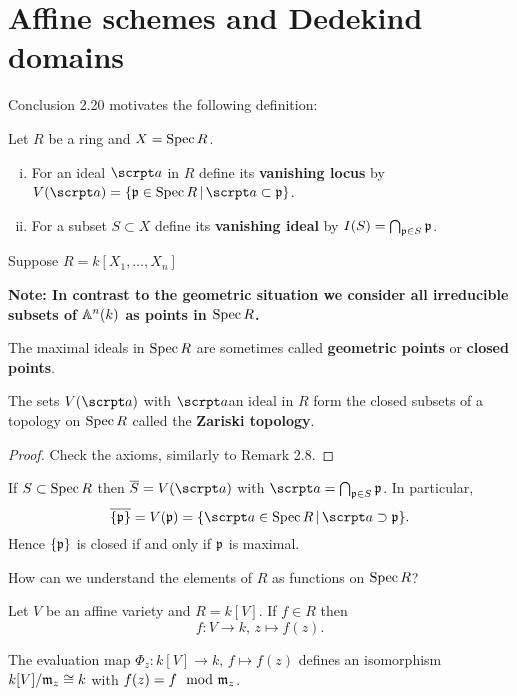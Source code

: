 \section{Affine schemes and Dedekind domains}
Conclusion 2.20 motivates the following definition:

\begin{defi}
Let $R$ be a ring and $X= \operatorname{Spec} R$.
\begin{enumerate}[(i)]
\item For an ideal $\a$ in $R$ define its \textbf{vanishing locus} by $V(\a) = \{\p \in \Spec R \, | \, \a \subset \p  \}$.
\item For a subset $S \subset X$ define its \textbf{vanishing ideal} by $I(S) = \bigcap_{ \mathfrak{p} \in S } \mathfrak{p}$.
\end{enumerate}
\end{defi}

\begin{Bemdef}
Suppose $R = k[X_1,\dots,X_n]$

\bigskip
\textbf{Note: In contrast to the geometric situation we consider all irreducible subsets of $\mathbb{A}^n(k)$ as points in $\operatorname{Spec} R$.}

\bigskip The maximal ideals in $\operatorname{Spec} R$ are sometimes called \textbf{geometric points} or \textbf{closed points}.
\end{Bemdef}

\begin{Bem}
The sets $V(\a)$ with $\a $an ideal in $R$ form the closed subsets of a topology on $\operatorname{Spec} R$ called the \textbf{Zariski topology}.
\end{Bem}

\begin{proof}
Check the axioms, similarly to Remark 2.8.
\end{proof}

\begin{Bem}
If $S \subset \operatorname{Spec} R$ then $\overline{S} = V(\a)$ with $\a = \bigcap_{ \p \in S } \p$.
In particular, 
\[ \overline{\{\p\}} = V(\p) = \{ \a \in \Spec R \, | \, \a \supset \p \}.
\]
Hence $\{\mathfrak{p} \}$ is closed if and only if $\mathfrak{p}$ is maximal.
\end{Bem}


\begin{question*}
How can we understand the elements of $R$ as functions on $\operatorname{Spec} R$?
\end{question*}


\begin{Bsp}
Let $V$ be an affine variety and $R=k[V]$. If $f \in R$ then
\[ f \colon V \to k, \, z \mapsto f(z).
\]
\end{Bsp}


\begin{recall*}
The evaluation map $\Phi_z \colon k[V] \to k, \, f \mapsto f(z)$ defines an isomorphism
$k[V] / \mathfrak{m}_z \cong k$ with $f(z) = f \mod {\mathfrak{m}}_z$.	
\end{recall*}



